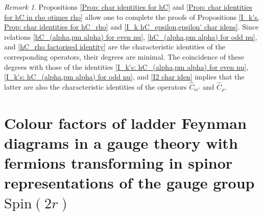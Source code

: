 \documentclass[a4paper]{article}
\newcommand{\hC}{\widehat{C}}
\newcommand{\Spin}{\mathrm{Spin}}
\renewcommand{\=}{\ =\ }
\numberwithin{equation}{section}
\theoremstyle{remark}
\newtheorem{remark}{Remark}
\begin{document}
\begin{remark}
Propositions \ref{Prop: char identities for hC} and \ref{Prop: char identities for hC in rho otimes rho} allow one to complete the proofs of Propositions \ref{I_k's, Prop: char identities for hC_rho} and \ref{I_k hC_epsilon,epsilon' char idens}. Since relations \eqref{hC_(alpha,pm alpha) for even nu}, \eqref{hC_(alpha,pm alpha) for odd nu}, and \eqref{hC_rho factorised identity} are the characteristic identities of the corresponding operators, their degrees are minimal. The coincidence of these degrees with those of the identities \eqref{I_k's: hC_(alpha,pm alpha) for even nu}, \eqref{I_k's: hC_(alpha,pm alpha) for odd nu}, and \eqref{I2 char iden} implies that the latter are also the characteristic identities of the operators $\hC_{\epsilon\epsilon'}$ and $\hC_\rho$.
\end{remark}


\section{Colour factors of ladder Feynman diagrams in a gauge theory with fermions transforming in spinor representations of the gauge group $\Spin(2r)$}\label{Sec: diagrams}
\end{document}
